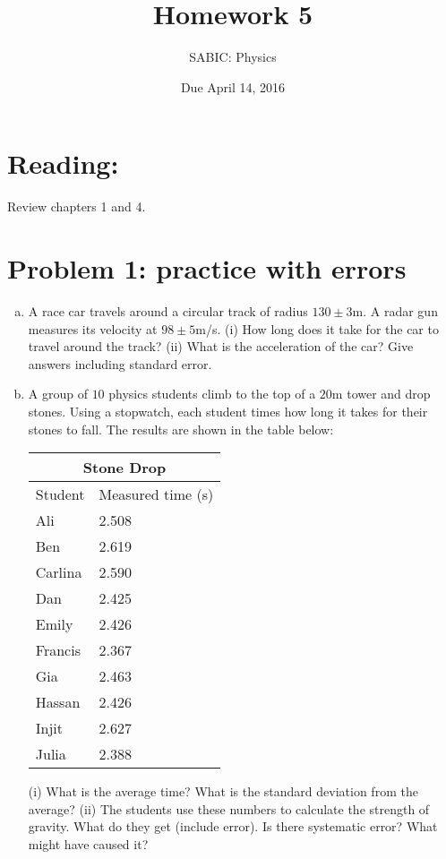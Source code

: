\documentclass[10pt,letter]{article}
\begin{document}


\title{Homework 5}

\author{SABIC: Physics}

\date{Due April 14, 2016}
 
\maketitle 

\section*{Reading:}
Review chapters 1 and 4.
\section*{Problem 1: practice with errors}
\begin{enumerate}[(a)]
\item A race car travels around a circular track of radius $130 \pm 3$m. A radar gun measures its velocity at $98 \pm 5$m/s. (i) How long does it take for the car to travel around the track? (ii) What is the acceleration of the car? Give answers including standard error.
\item A group of $10$ physics students climb to the top of a $20$m tower and drop stones. Using a stopwatch, each student times how long it takes for their stones to fall. The results are shown in the table below:
\begin{tabular}{ |p{6cm}||p{6cm}|  }
 \hline
 \multicolumn{2}{|c|}{Stone Drop} \\
 \hline
 Student & Measured time (s) \\
 \hline
 Ali & 2.508 \\
 Ben & 2.619 \\
 Carlina & 2.590 \\
 Dan & 2.425 \\
 Emily & 2.426 \\
 Francis & 2.367 \\
 Gia & 2.463 \\
 Hassan & 2.426 \\
 Injit &  2.627 \\
 Julia & 2.388 \\
 \hline
\end{tabular}
\newline
(i) What is the average time? What is the standard deviation from the average?
(ii) The students use these numbers to calculate the strength of gravity. What do they get (include error). Is there systematic error? What might have caused it?
\end{enumerate}
\end{document}

